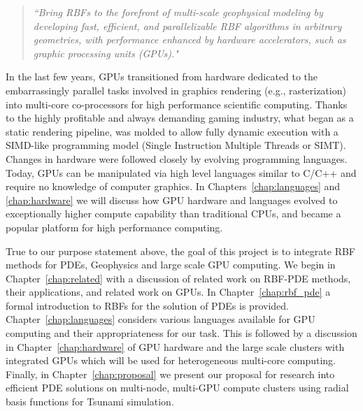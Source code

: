 \documentclass[11pt]{report}
\begin{document}
\begin{quote}
\emph{``Bring RBFs to the forefront of multi-scale geophysical modeling by developing fast, efficient, and parallelizable RBF algorithms in arbitrary geometries, with performance enhanced by hardware accelerators, such as graphic processing units (GPUs)."} \cite{RBF_proposal:2009}
\end{quote}

In the last few years, GPUs transitioned from hardware dedicated to the embarrassingly parallel tasks involved in graphics rendering (e.g., 
rasterization) into multi-core co-processors for high performance scientific computing.  Thanks to the highly profitable and always demanding gaming industry, what began as a static rendering pipeline, was molded to allow fully dynamic execution with a SIMD-like programming model (Single Instruction Multiple Threads or SIMT). Changes in hardware were 
followed closely by evolving programming languages. Today, GPUs can be manipulated via high level 
languages 
similar to C/C++ and require no knowledge of computer graphics. 
In Chapters~\ref{chap:languages} and \ref{chap:hardware} we will discuss 
how GPU hardware and languages evolved to exceptionally higher compute capability than traditional CPUs, and became a popular platform for high performance computing.

True to our purpose statement above, the goal of this project is to integrate RBF methods for PDEs, Geophysics and large scale GPU computing. We begin in Chapter~\ref{chap:related} with a discussion of related work on RBF-PDE methods, their applications, and related work 
on GPUs. In Chapter~\ref{chap:rbf_pde} a formal introduction to RBFs for the solution of PDEs is provided. Chapter~\ref{chap:languages} considers various languages available for GPU computing and 
their appropriateness for our task. This is followed by a 
discussion in Chapter~\ref{chap:hardware} of GPU hardware and the large scale clusters with integrated GPUs which will be used for heterogeneous multi-core computing. Finally, in Chapter~\ref{chap:proposal} we present our proposal for research into efficient PDE 
solutions on multi-node, multi-GPU compute clusters using radial basis functions for Tsunami simulation.

\ifstandalone


\end{document}
